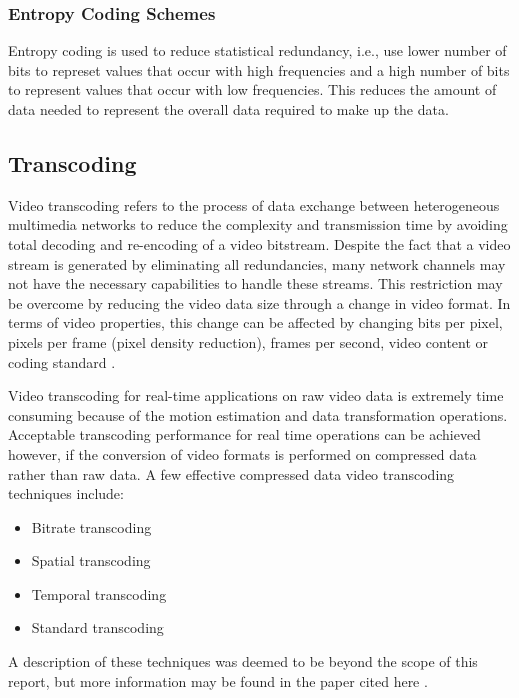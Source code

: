 \documentclass[letterpaper,12pt,titlepage,oneside,final]{report}
\begin{document}
            \subsubsection {Entropy Coding Schemes}
                Entropy coding is used to reduce statistical redundancy, i.e., use lower number of bits to represet values that occur with high frequencies and a high number of bits to represent values that occur with low frequencies. This reduces the amount of data needed to represent the overall data required to make up the data.

        \subsection{Transcoding}
            Video transcoding refers to the process of data exchange between heterogeneous multimedia networks to reduce the complexity and transmission time by avoiding total decoding and re-encoding of a video bitstream. Despite the fact that a video stream is generated by eliminating all redundancies, many network channels may not have the necessary capabilities to handle these streams. This restriction may be overcome by reducing the video data size through a change in video format. In terms of video properties, this change can be affected by changing bits per pixel, pixels per frame (pixel density reduction), frames per second, video content or coding standard \cite{Choupani}.

            Video transcoding for real-time applications on raw video data is extremely time consuming because of the motion estimation and data transformation operations. Acceptable transcoding performance for real time operations can be achieved however, if the conversion of video formats is performed on compressed data rather than raw data. A few effective compressed data video transcoding techniques include:
            \begin{itemize}
                \item{Bitrate transcoding}
                \item{Spatial transcoding}
                \item{Temporal transcoding}
                \item{Standard transcoding}
            \end{itemize}
            A description of these techniques was deemed to be beyond the scope of this report, but more information may be found in the paper cited here \cite{Choupani}.
\end{document}
